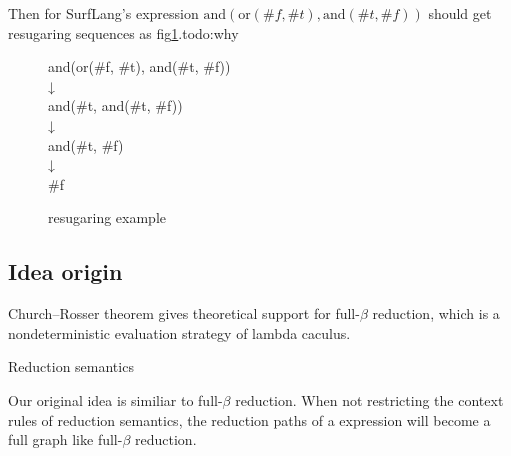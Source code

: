 Then for SurfLang's expression $\mbox{and}(\mbox{or}(\#f, \#t), \mbox{and}(\#t, \#f))$ should get resugaring sequences as fig\ref{fig:example}.todo:why

\begin{figure}[ht]
\parbox[t]{\textwidth}{
			\begin{center}  
				and(or(\#f, \#t), and(\#t, \#f))\\
				↓\\
				and(\#t, and(\#t, \#f))\\
				↓\\
				and(\#t, \#f)\\
				↓\\
				\#f
			\end{center}  
		}
\caption{resugaring example}
\label{fig:example}
\end{figure}
\subsection{Idea origin}
Church–Rosser theorem\cite{churchrosser} gives theoretical support for full-$\beta$ reduction, which is a nondeterministic evaluation strategy of lambda caculus. 

Reduction semantics

Our original idea is similiar to full-$\beta$ reduction. When not restricting the context rules of reduction semantics, the reduction paths of a expression will become a full graph like full-$\beta$ reduction.
